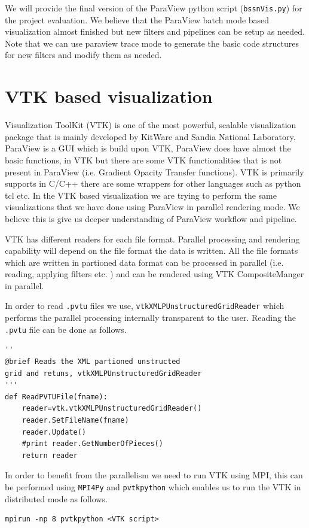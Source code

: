 We will provide the final version of the ParaView python script (\texttt{bssnVis.py}) for the project evaluation. We believe that the ParaView batch mode based visualization almost finished but new filters and pipelines can be setup as needed.
Note that we can use paraview trace mode to generate the basic code structures for new filters and modify them as needed. 

\section{VTK based visualization }
Visualization ToolKit (VTK) is one of the most powerful, scalable visualization package that is mainly developed by KitWare and Sandia National Laboratory. ParaView is a GUI which is build upon VTK, ParaView does have almost the basic functions, 
in VTK but there are some VTK functionalities that is not present in ParaView (i.e. Gradient Opacity Transfer functions). VTK is primarily supports in C/C++ there are some wrappers for other languages such as python tcl etc. In the VTK based visualization 
we are trying to perform the same visualizations that we have done using ParaView in parallel rendering mode. We believe this is give us deeper understanding of ParaView workflow and pipeline. 

VTK has different readers for each file format. Parallel processing and rendering capability will depend on the file format the data is written. All the file formats which are written in partioned data format can be processed in parallel (i.e. reading, applying filters etc. )
and can be rendered using VTK CompositeManger in parallel. 

In order to read \texttt{.pvtu} files we use, \texttt{vtkXMLPUnstructuredGridReader} which performs the parallel processing internally transparent to the user. Reading the \texttt{.pvtu} file can be done as follows. 
\begin{lstlisting}[basicstyle=\small]
''
@brief Reads the XML partioned unstructed 
grid and retuns, vtkXMLPUnstructuredGridReader
'''
def ReadPVTUFile(fname):
    reader=vtk.vtkXMLPUnstructuredGridReader()
    reader.SetFileName(fname)
    reader.Update()
    #print reader.GetNumberOfPieces()
    return reader
\end{lstlisting}

In order to benefit from the parallelism we need to run VTK using MPI, this can be performed using \texttt{MPI4Py} and \texttt{pvtkpython} which enables us to run the VTK in distributed mode as follows.
\begin{lstlisting}[basicstyle=\small]
    mpirun -np 8 pvtkpython <VTK script>
\end{lstlisting} 

